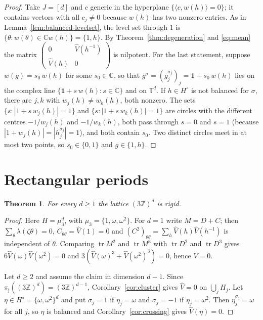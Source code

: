 \documentclass[11pt,reqno]{amsart}
\newtheorem{theorem}{Theorem}[section]
\theoremstyle{definition}
\theoremstyle{remark}
\newcommand{\C}{\mathbb C}
\newcommand{\Z}{\mathbb Z}
\newcommand{\T}{\mathbb T}
\DeclareMathOperator{\tr}{tr}
\begin{document}
\begin{proof}
Take $J=[d]$ and $c$ generic in the hyperplane $\{\langle c,w(h)\rangle=0\}$; it
contains vectors with all $c_j\ne0$ because $w(h)$ has two nonzero entries.
As in Lemma~\ref{lem:balanced-levelset}, the level set through $1$ is
$\{\theta:w(\theta)\in\C w(h)\}=\{1,h\}$.  By Theorem~\ref{thm:degeneration} and
\eqref{eq:mean} the matrix $\left(\begin{smallmatrix}0&\widehat V(h^{-1})\\ \widehat V(h)&0\end{smallmatrix}\right)$
is nilpotent.  For the last statement, suppose $w(g)=s_0\,w(h)$ for some
$s_0\in\C$, so that $g^\sigma=(g_j^{\sigma_j})_j=\mathbf 1+s_0\,w(h)$ lies on the
complex line $\{\mathbf 1+s\,w(h):s\in\C\}$ and on $\T^d$.  If $h\in H^\circ$ is
not balanced for $\sigma$, there are $j,k$ with $w_j(h)\ne w_k(h)$, both nonzero.
The sets $\{s:|1+s\,w_j(h)|=1\}$ and $\{s:|1+s\,w_k(h)|=1\}$ are circles with the
different centres $-1/w_j(h)$ and $-1/w_k(h)$, both pass through $s=0$ and $s=1$
(because $|1+w_j(h)|=|h_j^{\sigma_j}|=1$), and both contain $s_0$.  Two distinct
circles meet in at most two points, so $s_0\in\{0,1\}$ and $g\in\{1,h\}$.
\end{proof}

\section{Rectangular periods}\label{sec:rect}

\begin{theorem}\label{thm:3Zd}
For every $d\ge1$ the lattice $(3\Z)^d$ is rigid.
\end{theorem}

\begin{proof}
Here $H=\mu_3^d$, with $\mu_3=\{1,\omega,\omega^2\}$.  For $d=1$ write
$M=D+C$; then $\sum_\theta\lambda(\zeta\theta)=0$, $C_{\theta\theta}=\widehat V(1)=0$
and $(C^2)_{\theta\theta}=\sum_h\widehat V(h)\widehat V(h^{-1})$ is independent of $\theta$.
Comparing $\tr M^2$ and $\tr M^3$ with $\tr D^2$ and $\tr D^3$ gives
$6\widehat V(\omega)\widehat V(\omega^2)=0$ and
$3(\widehat V(\omega)^3+\widehat V(\omega^2)^3)=0$, hence $V=0$.

Let $d\ge2$ and assume the claim in dimension $d-1$.  Since
$\pi_{\hat\jmath}((3\Z)^d)=(3\Z)^{d-1}$, Corollary~\ref{cor:cluster} gives
$\widehat V=0$ on $\bigcup_jH_j$.  Let $\eta\in H^\circ=\{\omega,\omega^2\}^d$ and
put $\sigma_j=1$ if $\eta_j=\omega$ and $\sigma_j=-1$ if $\eta_j=\omega^2$.  Then
$\eta_j^{\sigma_j}=\omega$ for all $j$, so $\eta$ is balanced and
Corollary~\ref{cor:crossing} gives $\widehat V(\eta)=0$.
\end{proof}
\end{document}
